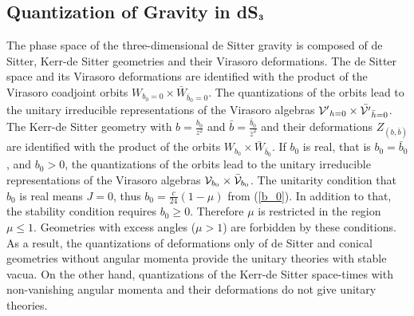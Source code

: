 \documentclass[a4paper,11pt]{article}
\begin{document}
\subsection{Quantization of Gravity in dS$\bf _3$}
The phase space of the three-dimensional de Sitter gravity is composed 
of de Sitter, Kerr-de Sitter geometries and their Virasoro 
deformations.
The de Sitter space and its Virasoro deformations are identified with 
the product of the Virasoro coadjoint orbits 
$W_{b_0=0}\times\bar{W}_{\bar{b}_0=0}$. 
The quantizations of the orbits lead to the unitary irreducible
representations of the Virasoro algebras 
${\cal V'}_{h=0}\times \bar{{\cal V'}}_{\bar{h}=0}$.
The Kerr-de Sitter geometry with $b=\frac{b_0}{z^2}$ and
$\bar{b}=\frac{\bar{b}_0}{\bar{z}^2}$ and their deformations 
$Z_{(b, \bar{b})}$  are identified with the product of the orbits 
$W_{b_0}\times\bar{W}_{\bar{b}_0}$.
If $b_0$ is real, that is $b_0=\bar{b}_0$, and $b_0>0$, 
the quantizations of the orbits lead to the unitary irreducible
representations of the Virasoro algebras 
${\cal V}_{b_0}\times \bar{{\cal V}}_{b_0}$.
The unitarity condition that $b_0$ is real means $J=0$, 
thus $b_0=\frac{c}{24}(1-\mu)$ from (\ref{b_0}).
In addition to that, the stability condition requires $b_0 \geq 0$. 
Therefore $\mu$ is restricted in the region $\mu \leq 1$.
Geometries with excess angles ($\mu >1$) are forbidden 
by these conditions.
As a result, the quantizations of deformations only of de Sitter
and conical geometries without angular momenta provide the unitary theories
with stable vacua. 
On the other hand, quantizations of the Kerr-de Sitter space-times 
with non-vanishing angular momenta and their deformations 
do not give unitary theories.
\end{document}
